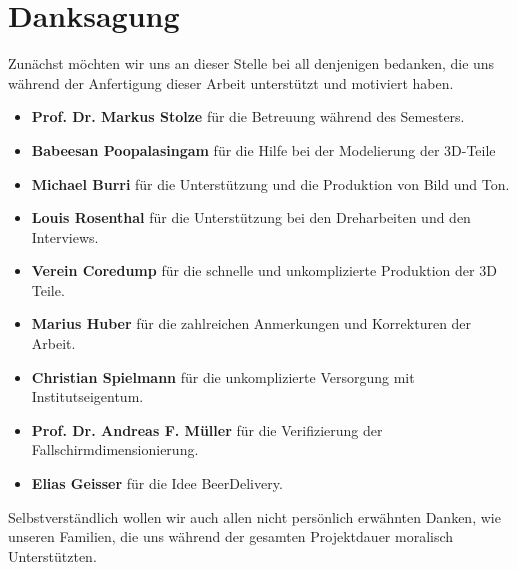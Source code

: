 \newpage
{}
\chapter*{Danksagung}
Zunächst möchten wir uns an dieser Stelle bei all denjenigen bedanken, die uns während der Anfertigung dieser Arbeit unterstützt und motiviert haben.
\begin{itemize}
	\item{\textbf{Prof. Dr. Markus Stolze} für die Betreuung während des Semesters.}
	\item{\textbf{Babeesan Poopalasingam} für die Hilfe bei der Modelierung der 3D-Teile}
	\item{\textbf{Michael Burri} für die Unterstützung und die Produktion von Bild und Ton.}
	\item{\textbf{Louis Rosenthal} für die Unterstützung bei den Dreharbeiten und den Interviews.}
	\item{\textbf{Verein Coredump} für die schnelle und unkomplizierte Produktion der 3D Teile.}
	\item{\textbf{Marius Huber} für die zahlreichen Anmerkungen und Korrekturen  der Arbeit.}
	\item{\textbf{Christian Spielmann} für die unkomplizierte Versorgung mit Institutseigentum.}
	\item{\textbf{Prof. Dr. Andreas F. Müller} für die Verifizierung der Fallschirmdimensionierung.}
	\item{\textbf{Elias Geisser} für die Idee BeerDelivery.}	
\end{itemize}
Selbstverständlich wollen wir auch allen nicht persönlich erwähnten Danken, wie unseren Familien, die uns während der gesamten Projektdauer moralisch Unterstützten.